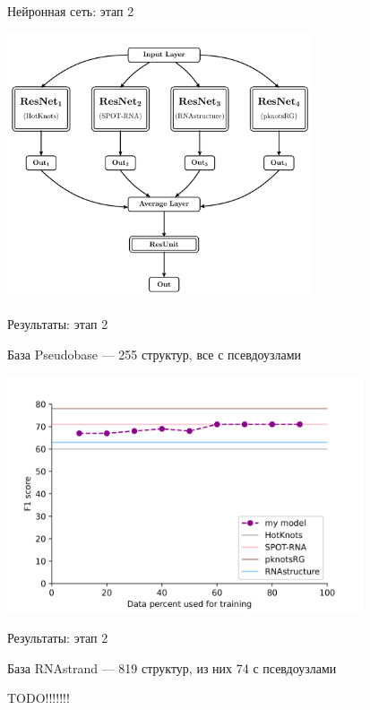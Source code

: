 \documentclass{beamer}
\begin{document}
\begin{frame}{Нейронная сеть: этап 2}

\centering
\includegraphics[width=9.0cm]{pics/nn.pdf}

    
\end{frame}


\begin{frame}{Результаты: этап 2}

База Pseudobase --- 255 структур, все с псевдоузлами

\centering
\includegraphics[width=10.5cm]{pics/plot_pb.png}

\end{frame}

\begin{frame}{Результаты: этап 2}

База RNAstrand --- 819 структур, из них 74 с псевдоузлами

\centering
TODO!!!!!!!

\end{frame}
\end{document}
